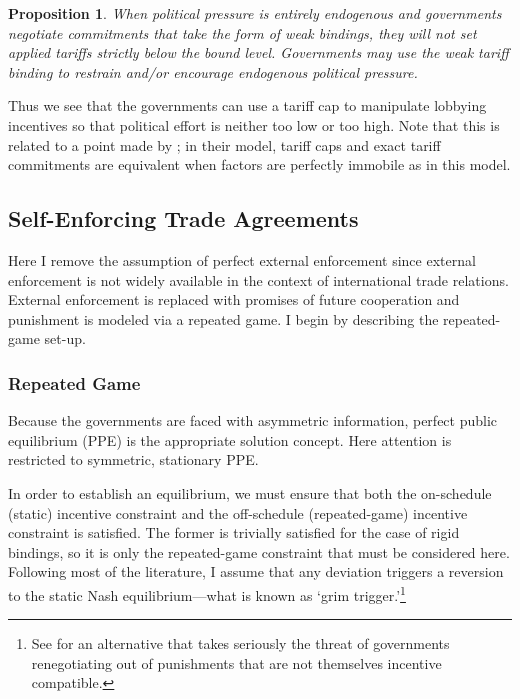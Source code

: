 \documentclass[12pt]{article}
\newtheorem{proposition}{Proposition}
\begin{document}
\begin{proposition}
    When political pressure is entirely endogenous and governments negotiate commitments that take the form of weak bindings, they will not set applied tariffs strictly below the bound level. Governments may use the weak tariff binding to restrain and/or encourage endogenous political pressure.
		\label{res:weak}
\end{proposition}

Thus we see that the governments can use a tariff cap to manipulate lobbying incentives so that political effort is neither too low or too high. Note that this is related to a point made by \Textcite{mrc2007}; in their model, tariff caps and exact tariff commitments are equivalent when factors are perfectly immobile as in this model.
					
	
\subsection{Self-Enforcing Trade Agreements}
\label{sec:self}
Here I remove the assumption of perfect external enforcement since external enforcement is not widely available in the context of international trade relations. External enforcement is replaced with promises of future cooperation and punishment is modeled via a repeated game. I begin by describing the repeated-game set-up. 

\subsubsection{Repeated Game}
Because the governments are faced with asymmetric information, perfect public equilibrium (PPE) is the appropriate solution concept. Here attention is restricted to symmetric, stationary PPE.
	
In order to establish an equilibrium, we must ensure that both the on-schedule (static) incentive constraint and the off-schedule (repeated-game) incentive constraint is satisfied. The former is trivially satisfied for the case of rigid bindings, so it is only the repeated-game constraint that must be considered here. Following most of the literature, I assume that any deviation triggers a reversion to the static Nash equilibrium---what is known as `grim trigger.'\footnote{See \Textcite{krw} for an alternative that takes seriously the threat of governments renegotiating out of punishments that are not themselves incentive compatible.\label{fn:krw}}
	
\end{document}
